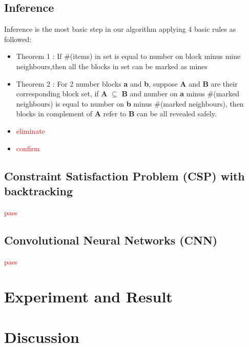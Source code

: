 \documentclass[10pt,twocolumn,letterpaper]{article}
\begin{document}
\subsection{Inference}
Inference is the most basic step in our algorithm applying 4 basic rules as followed:
	\begin{itemize}
		\item Theorem 1 : If \#(items) in set is equal to number on block minus mine neighbours,then all the blocks in set can be marked as mines
		\item Theorem 2 : For 2 number blocks \textbf{a} and \textbf{b}, suppose \textbf{A} and \textbf{B} are their corresponding block set, if \textbf{A} $\subseteq$ \textbf{B} and number on \textbf{a} minus \#(marked neighbours) is equal to number on \textbf{b} minus \#(marked neighbours), then blocks in complement of \textbf{A} refer to \textbf{B} can be all revealed safely.
		\item \textcolor{red}{eliminate}
		\item \textcolor{red}{confirm}
	\end{itemize}
	 


\subsection{Constraint Satisfaction Problem (CSP) with backtracking}
\textcolor{red}{pass}

\subsection{Convolutional Neural Networks (CNN)}
\textcolor{red}{pass}

\section{Experiment and Result}
     \begin{figure}[H]
     \centering
     \label{result}
     \end{figure}

\section{Discussion}



{\small


}
\end{document}
